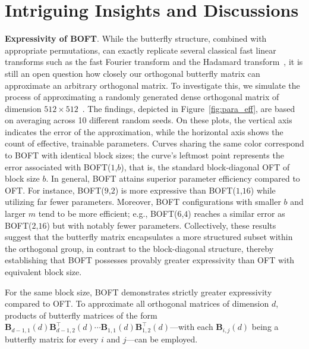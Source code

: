 \section{Intriguing Insights and Discussions}

\textbf{Expressivity of BOFT}. While the butterfly structure, combined with appropriate permutations, can exactly replicate several classical fast linear transforms such as the fast Fourier transform and the Hadamard transform~\cite{dao2019learning,dao2019kaleidoscope}, it is still an open question how closely our orthogonal butterfly matrix can approximate an arbitrary orthogonal matrix. To investigate this, we simulate the process of approximating a randomly generated dense orthogonal matrix of dimension $512\times 512$~\cite{anderson1987generation}. The findings, depicted in Figure~\ref{fig:para_eff}, are based on averaging across 10 different random seeds. On these plots, the vertical axis indicates the error of the approximation, while the horizontal axis shows the count of effective, trainable parameters. Curves sharing the same color correspond to BOFT with identical block sizes; the curve's leftmost point represents the error associated with BOFT($1$,$b$), that is, the standard block-diagonal OFT of block size $b$. In general, BOFT attains superior parameter efficiency compared to OFT. For instance, BOFT($9$,$2$) is more expressive than BOFT($1$,$16$) while utilizing far fewer parameters. Moreover, BOFT configurations with smaller $b$ and larger $m$ tend to be more efficient; e.g., BOFT($6$,$4$) reaches a similar error as BOFT($2$,$16$) but with notably fewer parameters. Collectively, these results suggest that the butterfly matrix encapsulates a more structured subset within the orthogonal group, in contrast to the block-diagonal structure, thereby establishing that BOFT possesses provably greater expressivity than OFT with equivalent block size.

\begin{theorem}\label{thm:exp_boft}
    For the same block size, BOFT demonstrates strictly greater expressivity compared to OFT. To approximate all orthogonal matrices of dimension $d$, products of butterfly matrices of the form $\bm{B}_{d-1,1}(d)\bm{B}^\top_{d-1,2}(d)\cdots\bm{B}_{1,1}(d)\bm{B}^\top_{1,2}(d)$—with each $\bm{B}_{i,j}(d)$ being a butterfly matrix for every $i$ and $j$—can be employed.
\end{theorem}

